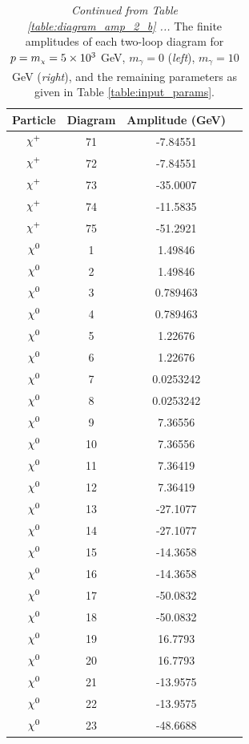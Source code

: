 \documentclass[11pt]{article}
\newcommand{\mychi}{\raisebox{0pt}[1ex][1ex]{\tiny$\chi$}}
\newcommand{\mychibig}{\raisebox{0pt}[1ex][1ex]{$\chi$}}
\def\mc{m_{\mychi}}
\begin{document}
\begin{table}[h!]
\caption{\textit{Continued from Table \ref{table:diagram_amp_2_b} ... } The finite amplitudes of each two-loop diagram for $p=\mc=5\times10^3$ GeV, $m_{\gamma}=0$ (\textit{left}), $m_{\gamma}=10$ GeV (\textit{right}), and the remaining parameters as given in Table \ref{table:input_params}.}\label{table:diagram_amp_2_c}
\centering
\vspace{0.2cm}
\begin{tabular}{c c c c}
Particle & Diagram & Amplitude (GeV) \\
\hline
$\mychibig^+$ & 71 & -7.84551 \\ 
$\mychibig^+$ & 72 & -7.84551 \\ 
$\mychibig^+$ & 73 & -35.0007 \\ 
$\mychibig^+$ & 74 & -11.5835 \\ 
$\mychibig^+$ & 75 & -51.2921 \\ 
$\mychibig^0$ & 1 & 1.49846 \\ 
$\mychibig^0$ & 2 & 1.49846 \\ 
$\mychibig^0$ & 3 & 0.789463 \\ 
$\mychibig^0$ & 4 & 0.789463 \\ 
$\mychibig^0$ & 5 & 1.22676 \\ 
$\mychibig^0$ & 6 & 1.22676 \\ 
$\mychibig^0$ & 7 & 0.0253242 \\ 
$\mychibig^0$ & 8 & 0.0253242 \\ 
$\mychibig^0$ & 9 & 7.36556 \\ 
$\mychibig^0$ & 10 & 7.36556 \\ 
$\mychibig^0$ & 11 & 7.36419 \\ 
$\mychibig^0$ & 12 & 7.36419 \\ 
$\mychibig^0$ & 13 & -27.1077 \\ 
$\mychibig^0$ & 14 & -27.1077 \\ 
$\mychibig^0$ & 15 & -14.3658 \\ 
$\mychibig^0$ & 16 & -14.3658 \\ 
$\mychibig^0$ & 17 & -50.0832 \\ 
$\mychibig^0$ & 18 & -50.0832 \\ 
$\mychibig^0$ & 19 & 16.7793 \\ 
$\mychibig^0$ & 20 & 16.7793 \\ 
$\mychibig^0$ & 21 & -13.9575 \\ 
$\mychibig^0$ & 22 & -13.9575 \\ 
$\mychibig^0$ & 23 & -48.6688 \\ 

\end{tabular}
\end{table}
\end{document}
